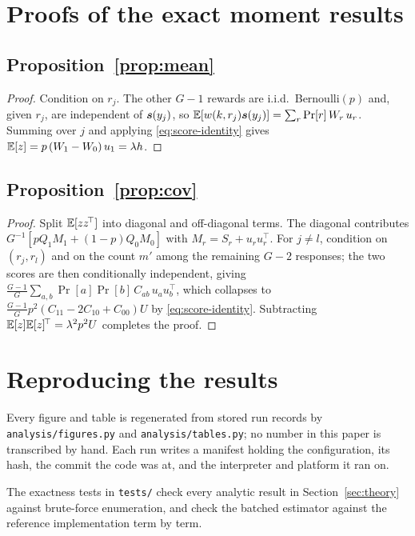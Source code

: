 \section{Proofs of the exact moment results}
\label{app:proofs}

\subsection*{Proposition~\ref{prop:mean}}
\begin{proof}
  Condition on $r_j$. The other $G-1$ rewards are i.i.d.\ Bernoulli$(p)$ and, given $r_j$, are
  independent of $\bm{s}(y_j)$, so
  $\mathbb{E}[w(k, r_j)\bm{s}(y_j)] = \sum_{r} \Pr[r]\, W_r\, u_r$. Summing over $j$ and applying
  \eqref{eq:score-identity} gives $\mathbb{E}[z] = p\,(W_1 - W_0)\,u_1 = \lambda h$.
\end{proof}

\subsection*{Proposition~\ref{prop:cov}}
\begin{proof}
  Split $\mathbb{E}[z z^{\!\top}]$ into diagonal and off-diagonal terms. The diagonal contributes
  $G^{-1}[p Q_1 M_1 + (1-p) Q_0 M_0]$ with $M_r = S_r + u_r u_r^{\!\top}$. For $j \neq l$,
  condition on $(r_j, r_l)$ and on the count $m'$ among the remaining $G-2$ responses; the two
  scores are then conditionally independent, giving
  $\frac{G-1}{G}\sum_{a,b}\Pr[a]\Pr[b]\,C_{ab}\,u_a u_b^{\!\top}$, which collapses to
  $\frac{G-1}{G} p^2 (C_{11} - 2C_{10} + C_{00}) U$ by \eqref{eq:score-identity}. Subtracting
  $\mathbb{E}[z]\mathbb{E}[z]^{\!\top} = \lambda^2 p^2 U$ completes the proof.
\end{proof}

\section{Reproducing the results}
\label{app:repro}

Every figure and table is regenerated from stored run records by
\texttt{analysis/figures.py} and \texttt{analysis/tables.py}; no number in this paper is
transcribed by hand. Each run writes a manifest holding the configuration, its hash, the commit the
code was at, and the interpreter and platform it ran on.

The exactness tests in \texttt{tests/} check every analytic result in Section~\ref{sec:theory}
against brute-force enumeration, and check the batched estimator against the reference
implementation term by term.

